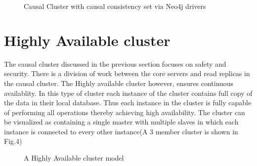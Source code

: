 \documentclass[9pt,twocolumn,twoside]{../../styles/osajnl}
\begin{document}
\begin{figure}[htbp]
\centering
{}
\caption{Causal Cluster with causal consistency set via Neo4j drivers ~\cite{www-neo4j-causal}}
\label{fig:false-color}
\end{figure}

\section{Highly Available cluster}
The causal cluster discussed in the previous section focuses on safety and security. There is a division of work between the core servers and read replicas in the causal cluster. The Highly available cluster however, ensures continuous availablity. In this type of cluster each instance of the cluster contains full copy of the data in their local database. Thus each instance in the cluster is fully capable of performing all operations thereby achieving high availability. The cluster can be visualized as containing a single master with multiple slaves in which each instance is connected to every other instance(A 3 member cluster is shown in Fig.4)

\begin{figure}[htbp]
\centering
{}
\caption{A Highly Available cluster model~\cite{www-neo4j-ha}}
\label{fig:false-color}
\end{figure}
\end{document}
